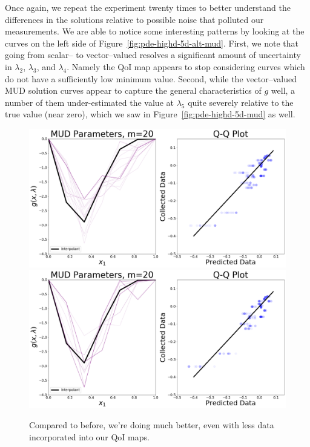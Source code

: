 Once again, we repeat the experiment twenty times to better understand the differences in the solutions relative to possible noise that polluted our measurements.
We are able to notice some interesting patterns by looking at the curves on the left side of Figure~\ref{fig:pde-highd-5d-alt-mud}.
First, we note that going from scalar-- to vector--valued resolves a significant amount of uncertainty in $\lambda_2$, $\lambda_3$, and $\lambda_4$.
Namely the QoI map appears to stop considering curves which do not have a sufficiently low minimum value.
Second, while the vector--valued MUD solution curves appear to capture the general characteristics of $g$ well, a number of them under-estimated the value at $\lambda_5$ quite severely relative to the true value (near zero), which we saw in Figure~\ref{fig:pde-highd-5d-mud} as well.

\begin{figure}[htbp]
\centering
  \includegraphics[width=0.95\linewidth]{figures/pde-highd/pde-highd_pair_D-alt-5-1_m20.png}
  \includegraphics[width=0.95\linewidth]{figures/pde-highd/pde-highd_pair_D-alt-5-5_m20.png}
\caption{Compared to before, we're doing much better, even with less data incorporated into our QoI maps.}
\label{fig:pde-highd-5d-alt-mud-20}
\end{figure}

